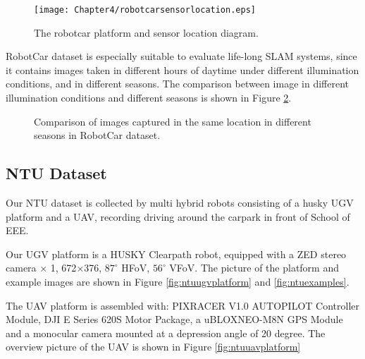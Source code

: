 \begin{figure}[H]
	\centering
	\texttt{[image: Chapter4/robotcarsensorlocation.eps]}
	\caption{The robotcar platform and sensor location diagram.}
	\label{fig:robotcarsensorlocation} 
\end{figure}

RobotCar dataset is especially suitable to evaluate life-long SLAM systems, since it contains images taken in different hours of daytime under different illumination conditions, and in different seasons. The comparison between image in different illumination conditions and different seasons is shown in Figure \ref{fig:robotcarcomparisonseason}.

\begin{figure}
	\centering
	\caption{Comparison of images captured in the same location in different seasons in RobotCar dataset.}
	\label{fig:robotcarcomparisonseason}
\end{figure}
	
\subsection{NTU Dataset}
\label{sec:ntuinfo}
Our NTU dataset is collected by multi hybrid robots consisting of a husky UGV platform and a UAV, recording driving around the carpark in front of School of EEE.

Our UGV platform is a HUSKY Clearpath robot, equipped with a ZED stereo camera $\times$ 1, 672$\times$376, $87^{\circ}$ HFoV, $56^{\circ}$ VFoV. The picture of the platform and example images are shown in Figure \ref{fig:ntuugvplatform} and \ref{fig:ntuexamples}.

The UAV platform is assembled with: PIXRACER V1.0 AUTOPILOT Controller Module, DJI E Series 620S Motor Package, a uBLOXNEO-M8N GPS Module and a monocular camera mounted at a depression angle of 20 degree. The overview picture of the UAV is shown in Figure \ref{fig:ntuuavplatform}

